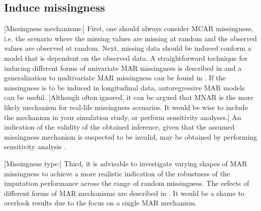 \documentclass[bimj,fleqn]{w-art}
\begin{document}
\subsection{Induce missingness}



[Missingness mechanisms:] 
First, one should always consider MCAR missingness, i.e. the scenario where the missing values are missing at random and the observed values are observed at random. %
Next, missing data should be induced conform a model that is dependent on the observed data. A straightforward technique for inducing different forms of univariate MAR missingness is described in \citet[][p. 63]{fimd} and a generalization to multivariate MAR missingness can be found in \citet{ampute}. If the missingness is to be induced in longitudinal data, autoregressive MAR models \citep[e.g. cf.][model 2 and model 3]{shara2015randomly} can be useful.
[Although often ignored, it can be argued that MNAR is the more likely mechanism for real-life missingness scenarios. It would be wise to include the mechanism in your simulation study, or perform sensitivity analyses.] An indication of the validity of the obtained inference, given that the assumed missingness mechanism is suspected to be invalid, may be obtained by performing sensitivity analysis \citep[see e.g.][part 5]{molenberghs2014handbook}.

[Missingness type:] 
Third, it is advisable to investigate varying shapes of MAR missingness to achieve a more realistic indication of the robustness of the imputation performance across the range of random missingness. The eefects of different forms of MAR mechanisms are described in \citet{scho18}.%
It would be a shame to overlook results due to the focus on a single MAR mechanism. 
\end{document}

